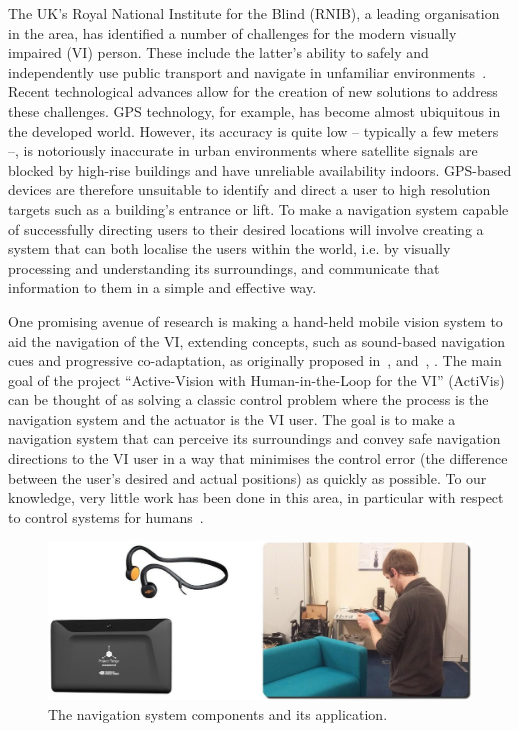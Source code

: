 \documentclass[letterpaper]{article}
\begin{document}
The UK's Royal National Institute for the Blind (RNIB), a leading organisation in the area, has identified a number of challenges for the modern visually impaired (VI) person. These include the latter's ability to safely and independently use public transport and navigate in unfamiliar environments~\cite{rnib-objectives}. Recent technological advances allow for the creation of new solutions to address these challenges. GPS technology, for example, has become almost ubiquitous in the developed world. However, its accuracy is quite low -- typically a few meters --, is notoriously inaccurate in urban environments where satellite signals are blocked by high-rise buildings and have unreliable availability indoors. GPS-based devices are therefore unsuitable to identify and direct a user to high resolution targets such as a building's entrance or lift. To make a navigation system capable of successfully directing users to their desired locations will involve creating a system that can both localise the users within the world, i.e. by visually processing and understanding its surroundings, and communicate that information to them in a simple and effective way.

One promising avenue of research is making a hand-held mobile vision system to aid the navigation of the VI, extending concepts, such as sound-based navigation cues and progressive co-adaptation, as originally proposed in~\citeauthor{bellotto2013}, \citeyear{bellotto2013} and~\citeauthor{gallina2015}, \citeyear{gallina2015}. The main goal of the project ``Active-Vision with Human-in-the-Loop for the VI'' (ActiVis) can be thought of as solving a classic control problem where the process is the navigation system and the actuator is the VI user. The goal is to make a navigation system that can perceive its surroundings and convey safe navigation directions to the VI user in a way that minimises the control error (the difference between the user's desired and actual positions) as quickly as possible. To our knowledge, very little work has been done in this area, in particular with respect to control systems for humans~\cite{book-humancontrol}.

\begin{figure}
  \centering
  \includegraphics[width=0.8\columnwidth]{figures/fullset.jpg}
  \caption{The navigation system components and its application.\label{fig:fullset}}
\end{figure}
\end{document}
